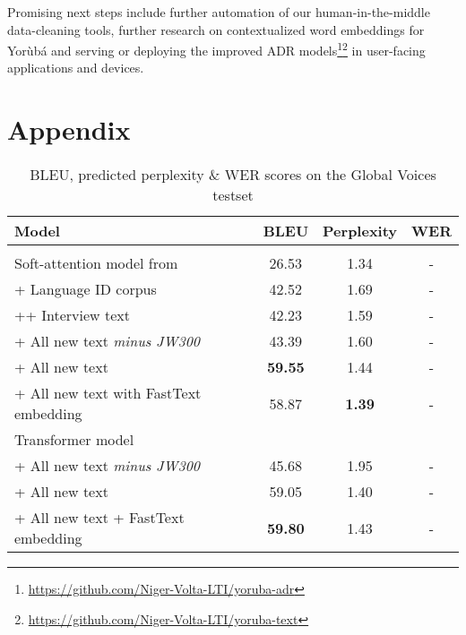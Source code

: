 \documentclass{article} %
\begin{document}
Promising next steps include further automation of our human-in-the-middle data-cleaning tools, further research on contextualized word embeddings for Yor{\`u}b{\'a} and serving or deploying the improved ADR models\footnote{\url{https://github.com/Niger-Volta-LTI/yoruba-adr}}\footnote{\url{https://github.com/Niger-Volta-LTI/yoruba-text}} in user-facing applications and devices.  





\clearpage

\appendix
\section{Appendix}\label{sec:appendix}

 \begin{table}[h]
  \caption{BLEU, predicted perplexity \& WER scores on the Global Voices testset}
  \label{tab:results-appendix}
 \begin{center}
  \begin{tabular}{lccc}
    \toprule
    \textbf{Model} & \textbf{BLEU} &\textbf{Perplexity} &\textbf{WER}\\
    \bottomrule
    \\
    Soft-attention model from \citep{orife2018adr} & 26.53 & 1.34 & -\\
    \midrule
	\hspace{5mm} + Language ID corpus & 42.52 & 1.69 & -\\ 
	\hspace{10mm} ++ Interview text & 42.23 & 1.59 & -\\
	\hspace{5mm} + All new text \it{minus} JW300 & 43.39 & 1.60 & -\\ 
	\hspace{5mm} + All new text & \textbf{59.55} & 1.44 & -\\ 
	\hspace{5mm} + All new text with FastText embedding & 58.87 & \textbf{1.39} & -\\ 
    \midrule
	Transformer model \\
	 \hspace{5mm} + All new text \it{minus} JW300 & 45.68 & 1.95 & -\\
	 \hspace{5mm} + All new text & 59.05 & 1.40 & -\\
	 \hspace{5mm} + All new text + FastText embedding & \textbf{59.80} & 1.43 & -\\ 
    \bottomrule
  \end{tabular}
  \end{center}
\end{table}
\end{document}
